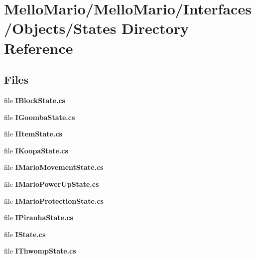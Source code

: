 \section{Mello\+Mario/\+Mello\+Mario/\+Interfaces/\+Objects/\+States Directory Reference}
\label{dir_a1473cb0706da7899773fb71f2fef581}
\subsection*{Files}
\begin{DoxyCompactItemize}
\item 
file \textbf{ I\+Block\+State.\+cs}
\item 
file \textbf{ I\+Goomba\+State.\+cs}
\item 
file \textbf{ I\+Item\+State.\+cs}
\item 
file \textbf{ I\+Koopa\+State.\+cs}
\item 
file \textbf{ I\+Mario\+Movement\+State.\+cs}
\item 
file \textbf{ I\+Mario\+Power\+Up\+State.\+cs}
\item 
file \textbf{ I\+Mario\+Protection\+State.\+cs}
\item 
file \textbf{ I\+Piranha\+State.\+cs}
\item 
file \textbf{ I\+State.\+cs}
\item 
file \textbf{ I\+Thwomp\+State.\+cs}
\end{DoxyCompactItemize}
